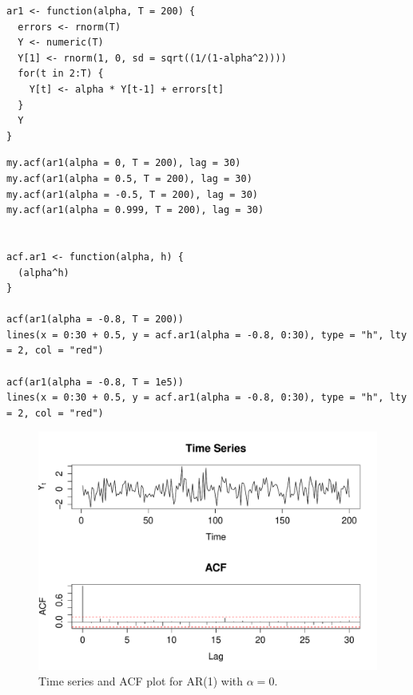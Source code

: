 \documentclass[10pt,a4paper]{article}
\begin{document}
\begin{lstlisting}
ar1 <- function(alpha, T = 200) {
  errors <- rnorm(T)
  Y <- numeric(T)
  Y[1] <- rnorm(1, 0, sd = sqrt((1/(1-alpha^2))))
  for(t in 2:T) {
    Y[t] <- alpha * Y[t-1] + errors[t]
  }
  Y
}
\end{lstlisting}

\begin{lstlisting}
my.acf(ar1(alpha = 0, T = 200), lag = 30)
my.acf(ar1(alpha = 0.5, T = 200), lag = 30)
my.acf(ar1(alpha = -0.5, T = 200), lag = 30)
my.acf(ar1(alpha = 0.999, T = 200), lag = 30)


acf.ar1 <- function(alpha, h) {
  (alpha^h)
}

acf(ar1(alpha = -0.8, T = 200))
lines(x = 0:30 + 0.5, y = acf.ar1(alpha = -0.8, 0:30), type = "h", lty = 2, col = "red")

acf(ar1(alpha = -0.8, T = 1e5))
lines(x = 0:30 + 0.5, y = acf.ar1(alpha = -0.8, 0:30), type = "h", lty = 2, col = "red")

\end{lstlisting}

\begin{figure}[h!]
\includegraphics[width=\linewidth]{plots/p5_alpha0.pdf}
\caption{Time series and ACF plot for AR(1) with $\alpha = 0$.}
\end{figure}
\end{document}
